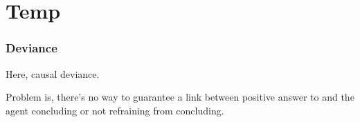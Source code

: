 \chapter{Temp}


\subsection{Deviance}
\label{sec:deviance}

\begin{note}
  Here, causal deviance.
\end{note}

\begin{note}
  Problem is, there's no way to guarantee a link between positive answer to \qzS{} and the agent concluding or not refraining from concluding.
\end{note}

